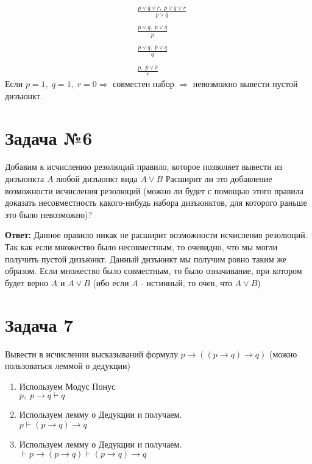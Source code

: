 \documentclass[a4paper, 12pt]{article} %
\begin{document}
\begin{align*}
    &\frac{p \vee \bar q \vee r, \; p \vee \bar q \vee \bar r}{p \vee \bar q} \\ \\
    &\frac{p \vee q, \;p \vee \bar q}{p} \\ \\
    &\frac{p \vee q, \;\bar p \vee q}{q} \\ \\
    &\frac{p, \; \bar{p} \vee  \bar r}{\bar r} 
\end{align*}
Если $p = 1, \; q = 1,\; r = 0 \Rightarrow$ совместен набор $\Rightarrow$ 
невозможно вывести пустой дизъюнкт.

\section*{Задача №6}
Добавим к исчислению резолюций правило, которое позволяет вывести из дизъюнкта
$A$
любой дизъюнкт вида
$A \vee B$
Расширит
ли это добавление возможности исчисления резолюций (можно 
ли будет с помощью этого правила доказать несовместность какого-нибудь
набора дизъюнктов, для которого раньше это было невозможно)?

\textbf{Ответ:} Данное правило никак не расширит возможности исчисления резолюций.
Так как если множество было несовместным, то очевидно, что мы могли получить пустой дизъюнкт.
Данный дизъюнкт мы получим ровно таким же образом. Если множество было совместным, 
то было означивание, при котором будет верно $A$ и $A \vee B$ 
(ибо если $A$ - истинный, то очев, что $A \vee B$)

\section*{Задача 7}
Вывести в исчислении высказываний формулу 
$p \rightarrow ((p \rightarrow q) \rightarrow q)$
(можно пользоваться леммой о дедукции)
\begin{enumerate}
    \item Используем Модус Понус  
    \\ $p, \; p \rightarrow q \vdash q$
    \item  Используем лемму о Дедукции и получаем.
     \\ $p \vdash (p \rightarrow q) \rightarrow q$
    \item Используем лемму о Дедукции и получаем.
     \\ $\vdash p \rightarrow 
     (p \rightarrow q) \vdash (p \rightarrow q) \rightarrow q$
\end{enumerate}
\end{document}
